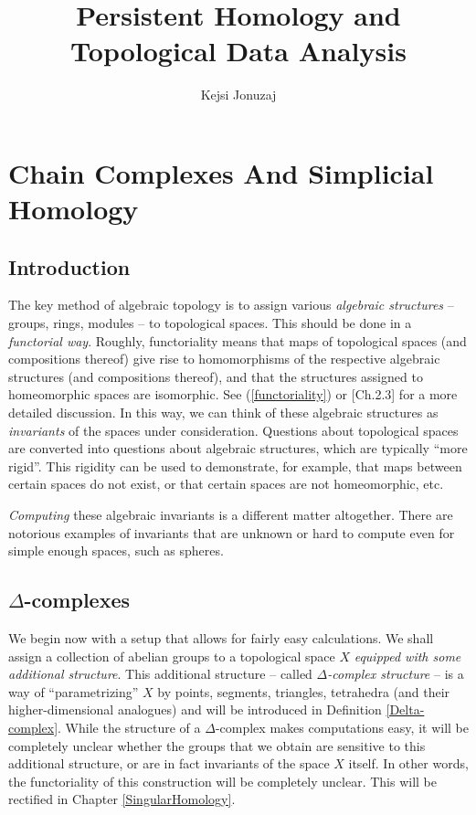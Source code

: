 \documentclass[11pt,a4paper]{report}
\author{Kejsi Jonuzaj}
\title{Persistent Homology and Topological Data Analysis}
\affil{American University in Bulgaria\\Department of Mathemathics and Science\\Supervisor: Prof. Peter Dalakov\\ \ \\Senior Thesis}
\begin{document}
\maketitle
\setcounter{tocdepth}{1}
\tableofcontents

     
      \chapter{Chain Complexes And Simplicial Homology}
      \label{chapter1}

      \section{Introduction} 
      
	      
	      The key method of  algebraic topology is to assign various \emph{algebraic structures} -- groups, rings, modules --  to topological spaces.
	      This should be done in a
	      \emph{ functorial way}. 
	      Roughly, functoriality means that maps of topological spaces (and compositions thereof) give rise to 
	      homomorphisms of the respective algebraic structures
	      (and compositions thereof), and that the structures assigned to homeomorphic spaces are isomorphic. 
	      See (\ref{functoriality}) or \cite{hatcher}[Ch.2.3] for a more detailed discussion.
	      In this way,
	      we can think of these algebraic structures as \emph{invariants} of the spaces under consideration.
	      Questions about topological
	      spaces  are converted into questions about algebraic structures, which  are typically ``more rigid''. This rigidity can
	      be used to demonstrate, for example,  that maps between certain spaces do not exist, or that certain spaces are not homeomorphic, etc. 
	      
	      \emph{Computing} these algebraic invariants is a different matter altogether. There are notorious examples of invariants that are unknown or
	      hard to compute even for simple enough spaces, such as spheres.
	      
	      \section{$\Delta$-complexes}
	      
	      We begin now with a setup that allows for fairly easy calculations. We shall
	      assign a collection of abelian groups to a topological space $X$ \emph{equipped with some additional structure}.
	      This additional structure -- called \emph{$\Delta$-complex structure} -- is a way of ``parametrizing'' $X$ by points, 
	      segments, triangles, tetrahedra (and their higher-dimensional analogues) and will be introduced in Definition \ref{Delta-complex}.
	      While the structure of a $\Delta$-complex makes computations easy, it will be completely unclear whether the groups that we obtain are sensitive
	      to this additional structure, or are in fact invariants  of the space $X$ itself. In other words, the functoriality of this construction will be completely unclear.
	      This will be rectified in Chapter \ref{SingularHomology}.
	      
\end{document}
